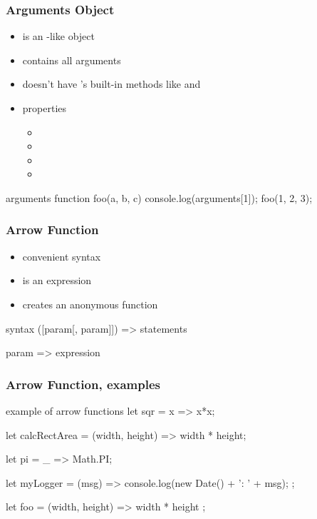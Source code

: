 \begin{frame}[fragile] \frametitle{Arguments Object}
\begin{itemize}
  \item {} is an -like object
  \item contains all arguments
  \item doesn't have 's built-in methods like  and 
  \item properties
  \begin{itemize}
    \item {}
    \item {}
    \item {}
    \item {}
  \end{itemize}
\end{itemize}

\begin{CodeBox}{arguments}
function foo(a, b, c) {
  console.log(arguments[1]);
}
foo(1, 2, 3);
\end{CodeBox}
\end{frame}

\begin{frame}[fragile] \frametitle{Arrow Function}

\begin{itemize}
  \item convenient syntax
  \item is an expression
  \item creates an anonymous function
\end{itemize}
\begin{CodeBox}{syntax}
([param[, param]]) => {
   statements
}

param => expression
\end{CodeBox}
\end{frame}


\begin{frame}[fragile] \frametitle{Arrow Function, examples}

\begin{CodeBox}{example of arrow functions}
let sqr = x => x*x;

let calcRectArea = (width, height) => width * height;

let pi = _ => Math.PI;

let myLogger = (msg) => {
  console.log(new Date() + ': ' + msg); 
};

let foo = (width, height) => { width * height };
\end{CodeBox}
\end{frame}

